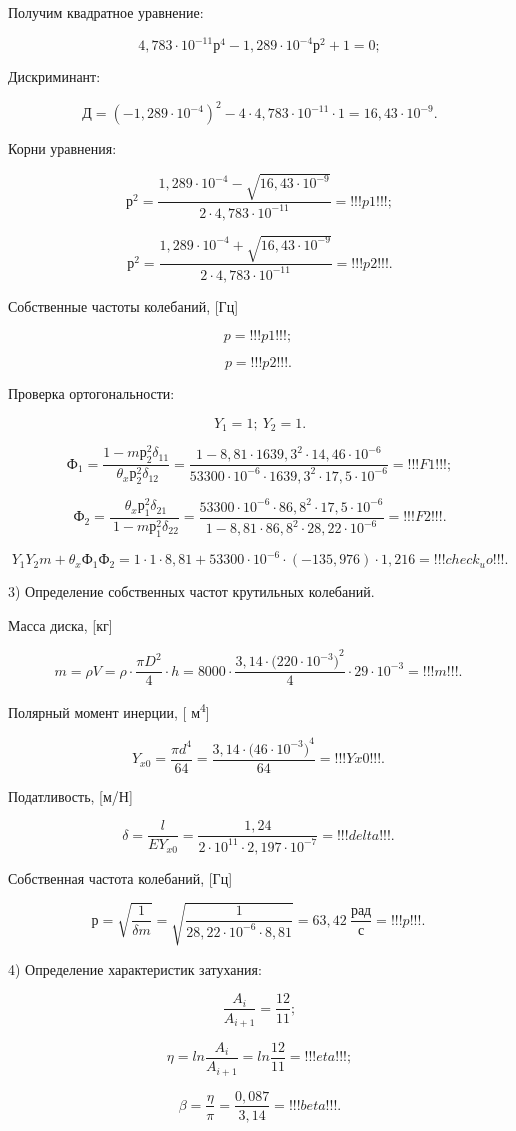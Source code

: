 Получим квадратное уравнение:

\[4,783\cdot10^{- 11}р^{4} - 1,289\cdot10^{- 4}р^{2} + 1 = 0;\]

Дискриминант:

\[Д = \left( - 1,289\cdot10^{- 4} \right)^{2} - 4\cdot4,783\cdot10^{- 11}\cdot1 = 16,43\cdot10^{- 9}.\]

Корни уравнения:

\[р^{2} = \frac{1,289\cdot10^{- 4} - \sqrt{16,43\cdot10^{- 9}}}{2\cdot4,783\cdot10^{- 11}} = !!!p1!!!;\]

\[р^{2} = \frac{1,289\cdot10^{- 4} + \sqrt{16,43\cdot10^{- 9}}}{2\cdot4,783\cdot10^{- 11}} = !!!p2!!!.\]

Собственные частоты колебаний, [Гц]

\[p  = !!!p1!!!;\ \]

\[p  = !!!p2!!!.\ \]

Проверка ортогональности:

\[Y_{1} = 1;\ Y_{2} = 1.\]

\[Ф_{1} = \frac{1 - mр_{2}^{2}\delta_{11}}{\ \theta_{x}р_{2}^{2}\delta_{12}} = \frac{1 - 8,81\cdot{1639,3}^{2}\cdot14,46\cdot10^{- 6}}{53300\cdot10^{- 6}\cdot{1639,3}^{2}\cdot17,5\cdot10^{- 6}} = !!!F1!!!;\]

\[Ф_{2} = \frac{\ \theta_{x}р_{1}^{2}\delta_{21}}{\ 1 - mр_{1}^{2}\delta_{22}} = \frac{53300\cdot10^{- 6}\cdot{86,8}^{2}\cdot17,5\cdot10^{- 6}}{1 - 8,81\cdot{86,8}^{2}\cdot28,22\cdot10^{- 6}} = !!!F2!!!.\]

\[Y_{1}Y_{2}m + \theta_{x}Ф_{1}Ф_{2} = 1\cdot1\cdot8,81 + 53300\cdot10^{- 6}\cdot( - 135,976)\cdot1,216 = !!!check_uo!!!.\]

3) Определение собственных частот крутильных колебаний.

Масса диска, [кг]

\[m = \rho V = \rho\cdot\frac{\pi D^{2}}{4}\cdot h = 8000\cdot\frac{3,14\cdot({220\cdot10^{- 3})}^{2}}{4}\cdot29\cdot10^{- 3} = !!!m!!!.\ \]

Полярный момент инерции, [ м\textsuperscript{4}]

\[Y_{x0} = \frac{\pi d^{4}}{64} = \frac{3,14\cdot({46\cdot10^{- 3})}^{4}}{64} = !!!Yx0!!!.\ \]

Податливость, [м/Н]

\[\delta = \frac{l}{EY_{x0}} = \frac{1,24}{2\cdot10^{11}\cdot2,197\cdot10^{- 7}} = !!!delta!!!.\ \]

Собственная частота колебаний, [Гц]

\[р = \sqrt{\frac{1}{\delta \textit{m}}} = \sqrt{\frac{1}{28,22\cdot10^{- 6}\cdot8,81}} = 63,42\ \frac{рад}{с} = !!!p!!!.\ \]

4) Определение характеристик затухания:

\[\frac{A_{i}}{A_{i + 1}} = \frac{12}{11};\]

\[\eta = ln\frac{A_{i}}{A_{i + 1}} = ln\frac{12}{11} = !!!eta!!!;\]

\[\beta = \frac{\eta}{\pi} = \frac{0,087}{3,14} = !!!beta!!!.\]


